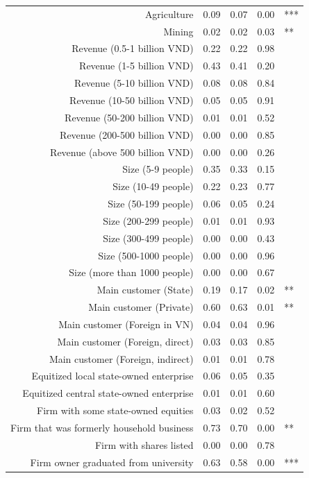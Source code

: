 \documentclass{beamer}
\begin{document}
\begin{frame}
\begin{columns}[T]
\begin{column}{.48\textwidth}
{\begin{tabular}{rrrrl}
  Agriculture & 0.09 & 0.07 & 0.00 & *** \\ 
  Mining & 0.02 & 0.02 & 0.03 & ** \\ 
  Revenue (0.5-1 billion VND) & 0.22 & 0.22 & 0.98 &  \\ 
  Revenue (1-5 billion VND) & 0.43 & 0.41 & 0.20 &  \\ 
  Revenue (5-10 billion VND) & 0.08 & 0.08 & 0.84 &  \\ 
  Revenue (10-50 billion VND) & 0.05 & 0.05 & 0.91 &  \\ 
  Revenue (50-200 billion VND) & 0.01 & 0.01 & 0.52 &  \\ 
  Revenue (200-500 billion VND) & 0.00 & 0.00 & 0.85 &  \\ 
  Revenue (above 500 billion VND) & 0.00 & 0.00 & 0.26 &  \\ 
  Size (5-9 people) & 0.35 & 0.33 & 0.15 &  \\ 
  Size (10-49 people) & 0.22 & 0.23 & 0.77 &  \\ 
  Size (50-199 people) & 0.06 & 0.05 & 0.24 &  \\ 
  Size (200-299 people) & 0.01 & 0.01 & 0.93 &  \\ 
  Size (300-499 people) & 0.00 & 0.00 & 0.43 &  \\ 
  Size (500-1000 people) & 0.00 & 0.00 & 0.96 &  \\ 
  Size (more than 1000 people) & 0.00 & 0.00 & 0.67 &  \\ 
  Main customer (State) & 0.19 & 0.17 & 0.02 & ** \\ 
  Main customer (Private) & 0.60 & 0.63 & 0.01 & ** \\ 
  Main customer (Foreign in VN) & 0.04 & 0.04 & 0.96 &  \\ 
  Main customer (Foreign, direct) & 0.03 & 0.03 & 0.85 &  \\ 
  Main customer (Foreign, indirect) & 0.01 & 0.01 & 0.78 &  \\ 
  Equitized local state-owned enterprise & 0.06 & 0.05 & 0.35 &  \\ 
  Equitized central state-owned enterprise & 0.01 & 0.01 & 0.60 &  \\ 
  Firm with some state-owned equities & 0.03 & 0.02 & 0.52 &  \\ 
  Firm that was formerly household business & 0.73 & 0.70 & 0.00 & ** \\ 
  Firm with shares listed & 0.00 & 0.00 & 0.78 &  \\ 
  Firm owner graduated from university & 0.63 & 0.58 & 0.00 & *** \\ 

\end{tabular}}
\end{column}
\end{columns}
\end{frame}
\end{document}
